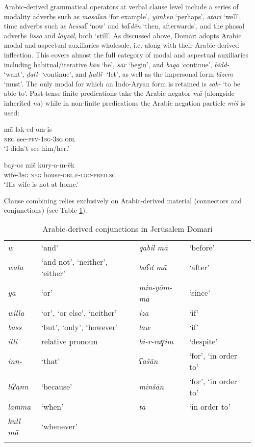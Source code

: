 \documentclass[output=paper]{langsci/langscibook}
\begin{document}
Arabic-derived grammatical operators at verbal clause level include a series of modality adverbs such as \textit{masalan} ‘for example’, \textit{yimken} ‘perhaps’, \textit{atāri} ‘well’, time adverbs such as \textit{hessaʕ} ‘now’ and \textit{baʕdēn} ‘then, afterwards’, and the phasal adverbs \textit{lissa} and \textit{lāyzāl}, both ‘still’. As discussed above, Domari adopts Arabic modal and aspectual auxiliaries wholesale, i.e. along with their Arabic-derived inflection. This covers almost the full category of modal and aspectual auxiliaries including habitual/iterative \textit{kān} ‘be’, \textit{ṣār} ‘begin’, and \textit{baqa} ‘continue’, \textit{bidd-} ‘want’, \textit{ḍall-} ‘continue’, and \textit{ḫallī-} ‘let’, as well as the impersonal form \textit{lāzem} ‘must’. The only modal for which an Indo-Aryan form is retained is \textit{sak-} ‘to be able to’. Past-tense finite predications take the Arabic negator \textit{mā} (alongside inherited \textit{na}) while in non-finite predications the Arabic negation particle \textit{miš} is used:

\ea \gll mā lak-ed-om-is\\
         \textsc{neg} see-\textsc{pfv-1sg-3sg.obl}\\
\glt     ‘I didn’t see him/her.’
\z

\ea \gll bay-os miš kury-a-m-ēk\\
         wife-\textsc{3sg} \textsc{neg} house-\textsc{obl.f-loc-pred.sg}\\
\glt     ‘His wife is not at home.’
\z

Clause combining relies exclusively on Arabic-derived material (connectors and conjunctions) (see Table \ref{conjs}).

\begin{table}[]
\begin{tabularx}{\textwidth}{XXXX}
\lsptoprule

{{\textit{w}}} & ‘and’ & {{\textit{qabil mā}}} & ‘before’\\
{{\textit{wala}}} & ‘and not’, ‘neither’, ‘either’ & {{\textit{baʕd mā}}} & ‘after’\\
{{\textit{yā}}} & ‘or’ & {{\textit{min-yōm-mā}}} & ‘since’\\
{{\textit{willa}}} & ‘or’, ‘or else’, ‘neither’ & {{\textit{iza}}} & ‘if’\\
{{\textit{bass}}} & ‘but’, ‘only’, ‘however’ & {{\textit{law}}} & ‘if’\\
{{\textit{illi}}} & relative pronoun & {{\textit{bi-r-raɣim}}} & ‘despite’\\
{{\textit{inn-}}} & ‘that’ & {{\textit{ʕašān}}} & ‘for’, ‘in order to’\\
{{\textit{liʔann}}} & ‘because’ & {{\textit{minšān}}} & ‘for’, ‘in order to’\\
{{\textit{lamma}}} & ‘when’ & {{\textit{ta}}} & ‘in order to’\\
{{\textit{kull mā}}} & ‘whenever’ &  & \\
\lspbottomrule
\end{tabularx}
  \caption{Arabic-derived conjunctions in Jerusalem Domari}
  \label{conjs}
  \end{table}
\end{document}
